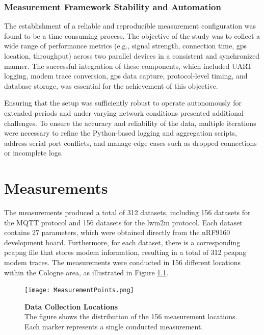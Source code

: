 \documentclass[12pt, english, openany]{book}
\begin{document}
\subsection{Measurement Framework Stability and Automation}

The establishment of a reliable and reproducible measurement configuration was found to be a time-consuming process. The objective of the study was to collect a wide range of performance metrics (e.g., signal strength, connection time, \gls{gps} location, throughput) across two parallel devices in a consistent and synchronized manner. The successful integration of these components, which included UART logging, modem trace conversion, \gls{gps} data capture, protocol-level timing, and database storage, was essential for the achievement of this objective.

Ensuring that the setup was sufficiently robust to operate autonomously for extended periods and under varying network conditions presented additional challenges. To ensure the accuracy and reliability of the data, multiple iterations were necessary to refine the Python-based logging and aggregation scripts, address serial port conflicts, and manage edge cases such as dropped connections or incomplete logs.

\chapter{Measurements} \label{chap:measurements}


The measurements produced a total of 312 datasets, including 156 datasets for the MQTT protocol and 156 datasets for the \gls{lwm2m} protocol. Each dataset contains 27 parameters, which were obtained directly from the nRF9160 development board. Furthermore, for each dataset, there is a corresponding pcapng file that stores modem information, resulting in a total of 312 pcapng modem traces. The measurements were conducted in 156 different locations within the Cologne area, as illustrated in Figure \ref{fig:measurement_points_map}.


\begin{figure}[htbp]
    \centering
    \texttt{[image: MeasurementPoints.png]}
    \caption{\textbf{Data Collection Locations} \\ The figure shows the distribution of the 156 measurement locations. Each marker represents a single conducted measurement.}
    \label{fig:measurement_points_map}
\end{figure}
\end{document}
